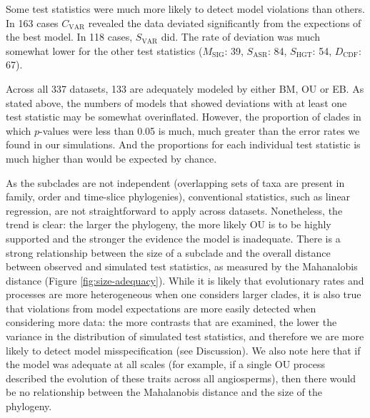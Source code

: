 Some test statistics were much more likely to detect model violations than others. In 163 cases $C_{\text{VAR}}$ revealed the data deviated significantly from the expections of the best model. In 118 cases, $S_{\text{VAR}}$ did. The rate of deviation was much somewhat lower for the other test statistics ($M_{\text{SIG}}$: 39, $S_{\text{ASR}}$: 84, $S_{\text{HGT}}$: 54, $D_{\text{CDF}}$: 67).

Across all 337 datasets, 133 are adequately modeled by either BM, OU or EB. As stated above, the numbers of models that showed deviations with at least one test statistic may be somewhat overinflated. However, the proportion of clades in which $p$-values were less than 0.05 is much, much greater than the error rates we found in our simulations. And the proportions for each individual test statistic is much higher than would be expected by chance. 

As the subclades are not independent (overlapping sets of taxa are present in family, order and time-slice phylogenies), conventional statistics, such as linear regression, are not straightforward to apply across datasets. Nonetheless, the trend is clear: the larger the phylogeny, the more likely OU is to be highly supported and the stronger the evidence the model is inadequate. There is a strong relationship between the size of a subclade and the overall distance between observed and simulated test statistics, as measured by the Mahanalobis distance (Figure \ref{fig:size-adequacy}). While it is likely that evolutionary rates and processes are more heterogeneous when one considers larger clades, it is also true that violations from model expectations are more easily detected when considering more data: the more contrasts that are examined, the lower the variance in the distribution of simulated test statistics, and therefore we are more likely to detect model misspecification (see Discussion). We also note here that if the model was adequate at all scales (for example, if a single OU process described the evolution of these traits across all angiosperms), then there would be no relationship between the Mahalanobis distance and the size of the phylogeny.

